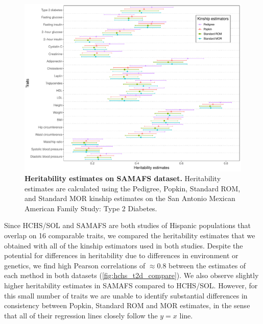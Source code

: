\documentclass[11pt]{article}
\begin{document}
\begin{figure}[bp!]
  \centering
  \includegraphics[width=\textwidth]{data/Fig2_T2D_maf001_agesex.pdf}
  \caption{
    {\bf Heritability estimates on SAMAFS dataset.}
    Heritability estimates are calculated using the Pedigree, Popkin, Standard ROM, and Standard MOR kinship estimates on the San Antonio Mexican American Family Study: Type 2 Diabetes.
    }
  \label{fig:T2D}
\end{figure}

Since HCHS/SOL and SAMAFS are both studies of Hispanic populations that overlap on 16 comparable traits, we compared the heritability estimates that we obtained with all of the kinship estimators used in both studies.
Despite the potential for differences in heritability due to differences in environment or genetics, we find high Pearson correlations of $\approx 0.8$ between the estimates of each method in both datasets (\cref{fig:hchs_t2d_compare}).
We also observe slightly higher heritability estimates in SAMAFS compared to HCHS/SOL.
However, for this small number of traits we are unable to identify substantial differences in consistency between Popkin, Standard ROM and MOR estimates, in the sense that all of their regression lines closely follow the $y=x$ line.
\end{document}
